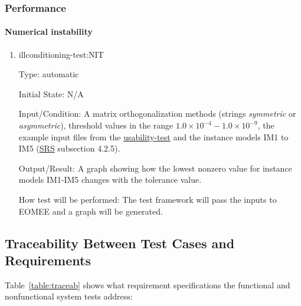 \documentclass[12pt, titlepage]{article}
\begin{document}
\subsubsection{Performance}
\label{section:performance}

\paragraph{Numerical instability}

\begin{enumerate}
	
	\item{illconditioning-test:NIT}
	
	Type: automatic
	
	Initial State: N/A
	
	Input/Condition: A matrix orthogonalization methods (strings 
	\textit{symmetric} or \textit{asymmetric}), threshold values in the range 
	$1.0 \times 10^{-4} - 1.0 \times 10^{-9}$, the example input files from the
	\hyperref[section:usability]{usability-test} and the instance models IM1 to 
	IM5 (\href{https://github.com/gabrielasd/eomee/tree/cas741/docs/SRS} {SRS} 
	subsection 4.2.5).
	
	Output/Result: A graph showing how the lowest nonzero value for instance 
	models IM1-IM5 changes with the tolerance value.
	
	How test will be performed: The test framework will pass the inputs to 
	EOMEE and a graph will be generated.
	
\end{enumerate}


\subsection{Traceability Between Test Cases and Requirements}
\label{section:systemtraceability}

Table~\ref{table:traceab} shows what requirement specifications the functional and nonfunctional system tests address:
\end{document}
